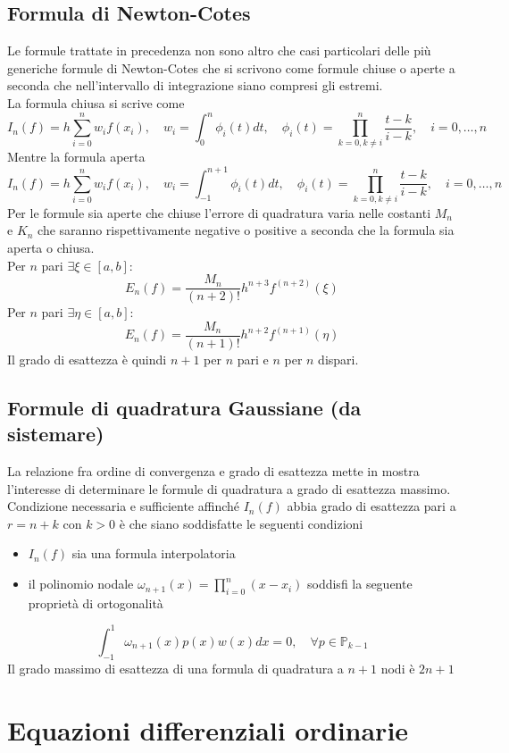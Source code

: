 \documentclass[a4paper,12pt]{article}
\begin{document}
\subsection{Formula di Newton-Cotes}
Le formule trattate in precedenza non sono altro che casi particolari delle più generiche formule di Newton-Cotes che si scrivono come formule chiuse o aperte a seconda che nell'intervallo di integrazione siano compresi gli estremi.\\
La formula chiusa si scrive come
$$
I_n(f) = h \sum\limits_{i=0}^n w_i f(x_i), \quad w_i = \int_0^n \phi_i(t)dt, \quad \phi_i(t) = \prod\limits_{k=0,k \neq i}^n  \frac{t-k}{i-k}, \quad i=0, \ldots, n
$$
Mentre la formula aperta
$$
I_n(f) = h \sum\limits_{i=0}^n w_i f(x_i), \quad w_i = \int_{-1}^{n+1} \phi_i(t)dt, \quad \phi_i(t) = \prod\limits_{k=0,k\neq i}^n  \frac{t-k}{i-k}, \quad i=0,\ldots,n
$$
Per le formule sia aperte che chiuse l'errore di quadratura varia nelle costanti $M_n$ e $K_n$ che saranno rispettivamente negative o positive a seconda che la formula sia aperta o chiusa. \\
Per $n$ pari $\exists \xi \in [a,b] :$
$$E_n(f) = \frac{M_n}{(n+2)!}h^{n+3}f^{(n+2)}(\xi)$$
Per $n$ pari $\exists \eta \in [a,b] :$
$$E_n(f) = \frac{M_n}{(n+1)!}h^{n+2}f^{(n+1)}(\eta)$$
Il grado di esattezza è quindi $n+1$ per $n$ pari e $n$ per $n$ dispari.
\subsection{Formule di quadratura Gaussiane (da sistemare)} 
La relazione fra ordine di convergenza e grado di esattezza mette in mostra l'interesse di determinare le formule di quadratura a grado di esattezza massimo. \\
Condizione necessaria e sufficiente affinché $I_n(f)$ abbia grado di esattezza pari a $r = n + k$ con $k > 0$ è che siano soddisfatte le seguenti condizioni
\begin{itemize}
\item $I_n(f)$ sia una formula interpolatoria 
\item il polinomio nodale $\omega_{n+1}(x) = \prod_{i=0}^n (x-x_i) $ soddisfi la seguente proprietà di ortogonalità
\end{itemize}
$$\int_{-1}^1 \omega_{n+1}(x) p(x) w(x) dx = 0, \quad \forall p \in \mathbb{P}_{k-1}$$
Il grado massimo di esattezza di una formula di quadratura a $n +1$ nodi è $2n + 1$ 
\section{Equazioni differenziali ordinarie}
\end{document}
